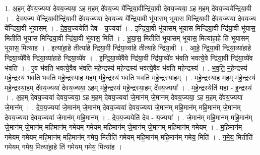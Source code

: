 \documentclass[17pt]{extarticle}
\begin{document}
1. अ॒हम् दे॑वय॒ज्यया॑ देवय॒ज्यया॒ ऽह म॒हम् दे॑वय॒ज्य ये᳚न्द्रिया॒वीन्द्रि॑या॒वी दे॑वय॒ज्यया॒ ऽह म॒हम् दे॑वय॒ज्यये᳚न्द्रिया॒वी । . दे॒व॒य॒ज्य ये᳚न्द्रिया॒वीन्द्रि॑या॒वी दे॑वय॒ज्यया॑ देवय॒ज्य ये᳚न्द्रिया॒वी भू॑यासम् भूयास मिन्द्रिया॒वी दे॑वय॒ज्यया॑ देवय॒ज्य ये᳚न्द्रिया॒वी भू॑यासम् । . दे॒व॒य॒ज्ययेति॑ देव - य॒ज्यया᳚ । . इ॒न्द्रि॒या॒वी भू॑यासम् भूयास मिन्द्रिया॒वी न्द्रि॑या॒वी भू॑यास॒ मितीति॑ भूयास मिन्द्रिया॒वी न्द्रि॑या॒वी भू॑यास॒ मिति॑ । . भू॒या॒स॒ मितीति॑ भूयासम् भूयास॒ मित्या॑हा॒हे ति॑ भूयासम् भूयास॒ मित्या॑ह । . इत्या॑हा॒हे तीत्या॑हे न्द्रिया॒वी न्द्रि॑या॒व्या॑हे तीत्या॑हे न्द्रिया॒वी । . आ॒हे॒ न्द्रि॒या॒वी न्द्रि॑या॒व्या॑हाहे न्द्रिया॒व्ये॑वैवे न्द्रि॑या॒व्या॑हाहे न्द्रिया॒व्ये॑व । . इ॒न्द्रि॒या॒व्ये॑वैवे न्द्रि॑या॒वी न्द्रि॑या॒व्ये॑व भ॑वति भवत्ये॒वे न्द्रि॑या॒वी न्द्रि॑या॒व्ये॑व भ॑वति । . ए॒व भ॑वति भवत्ये॒वैव भ॑वति महे॒न्द्रस्य॑ महे॒न्द्रस्य॑ भवत्ये॒वैव भ॑वति महे॒न्द्रस्य॑ । . भ॒व॒ति॒ म॒हे॒न्द्रस्य॑ महे॒न्द्रस्य॑ भवति भवति महे॒न्द्रस्या॒ह म॒हम् म॑हे॒न्द्रस्य॑ भवति भवति महे॒न्द्रस्या॒हम् । . म॒हे॒न्द्रस्या॒ह म॒हम् म॑हे॒न्द्रस्य॑ महे॒न्द्रस्या॒हम् दे॑वय॒ज्यया॑ देवय॒ज्यया॒ ऽहम् म॑हे॒न्द्रस्य॑ महे॒न्द्रस्या॒हम् दे॑वय॒ज्यया᳚ । . म॒हे॒न्द्रस्येति॑ महा - इ॒न्द्रस्य॑ । . अ॒हम् दे॑वय॒ज्यया॑ देवय॒ज्यया॒ ऽह म॒हम् दे॑वय॒ज्यया॑ जे॒मान॑म् जे॒मान॑म् देवय॒ज्यया॒ ऽह म॒हम् दे॑वय॒ज्यया॑ जे॒मान᳚म् । . दे॒व॒य॒ज्यया॑ जे॒मान॑म् जे॒मान॑म् देवय॒ज्यया॑ देवय॒ज्यया॑ जे॒मान॑म् महि॒मान॑म् महि॒मान॑म् जे॒मान॑म् देवय॒ज्यया॑ देवय॒ज्यया॑ जे॒मान॑म् महि॒मान᳚म् । . दे॒व॒य॒ज्ययेति॑ देव - य॒ज्यया᳚ । . जे॒मान॑म् महि॒मान॑म् महि॒मान॑म् जे॒मान॑म् जे॒मान॑म् महि॒मान॑म् गमेयम् गमेयम् महि॒मान॑म् जे॒मान॑म् जे॒मान॑म् महि॒मान॑म् गमेयम् । . म॒हि॒मान॑म् गमेयम् गमेयम् महि॒मान॑म् महि॒मान॑म् गमेय॒ मितीति॑ गमेयम् महि॒मान॑म् महि॒मान॑म् गमेय॒ मिति॑ । . ग॒मे॒य॒ मितीति॑ गमेयम् गमेय॒ मित्या॑हा॒हे ति॑ गमेयम् गमेय॒ मित्या॑ह । \newline
\end{document}
